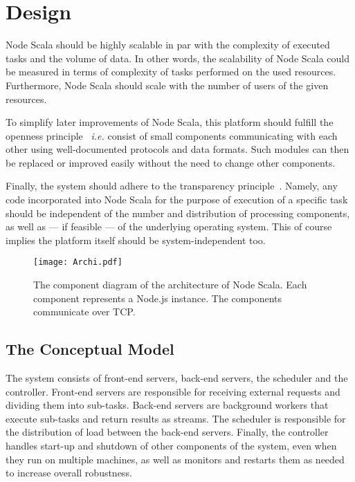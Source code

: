 \documentclass[10pt,conference,letterpaper]{IEEEtran}
\begin{document}
\section{Design}\label{lab:design}

Node Scala should be highly scalable in par with the complexity of
executed tasks and the volume of data. In other words, the scalability
of Node Scala could be measured in terms of complexity of tasks
performed on the used resources. Furthermore, Node Scala should scale
with the number of users of the given resources.

To simplify later improvements of Node Scala, this platform should
fulfill the openness principle~\cite{Tanenbaum:2006:DSP:1202502}
\textit{i.e.} consist of small components communicating with each
other using well-documented protocols and data formats. Such modules
can then be replaced or improved easily without the need to change
other components.

Finally, the system should adhere to the transparency
principle~\cite{Tanenbaum:2006:DSP:1202502}. Namely, any code
incorporated into Node Scala for the purpose of execution of a
specific task should be independent of the number and distribution of
processing components, as well as --- if feasible --- of the
underlying operating system. This of course implies the platform
itself should be system-independent too.

\begin{figure*}
  \centering
  \texttt{[image: Archi.pdf]}
  \caption{The component diagram of the architecture of Node
          Scala. Each component represents a Node.js instance. The
          components communicate over TCP.}
  \label{fig:Archi_figure}
\end{figure*}

\subsection{The Conceptual Model}

The system consists of front-end servers, back-end servers, the
scheduler and the controller. Front-end servers are responsible for
receiving external requests and dividing them into sub-tasks. Back-end
servers are background workers that execute sub-tasks and return
results as streams. The scheduler is responsible for the distribution
of load between the back-end servers. Finally, the controller handles
start-up and shutdown of other components of the system, even when
they run on multiple machines, as well as monitors and restarts them
as needed to increase overall robustness.
\end{document}
